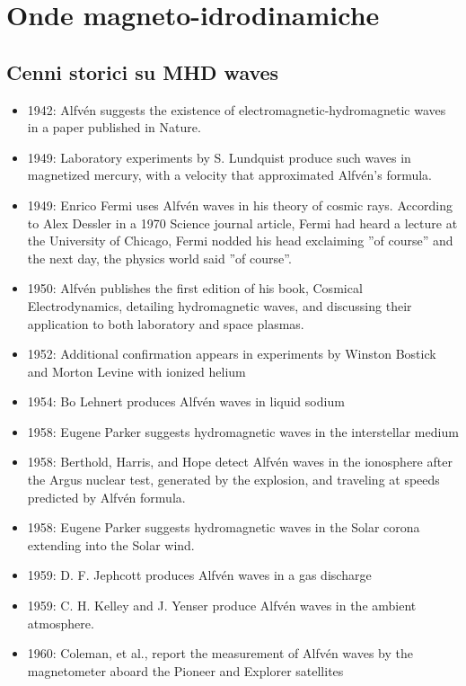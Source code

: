 \documentclass[../main.tex]{subfiles}
\begin{document}
\chapter{Onde magneto-idrodinamiche}
\PartialToc

\section{Cenni storici su MHD waves}
\cite{alfvenweves}

\begin{itemize}
\item 1942: Alfv\'en suggests the existence of electromagnetic-hydromagnetic waves in a paper published in Nature.
\item 1949: Laboratory experiments by S. Lundquist produce such waves in magnetized mercury, with a velocity that approximated Alfvén's formula.
\item 1949: Enrico Fermi uses Alfv\'en waves in his theory of cosmic rays. According to Alex Dessler in a 1970 Science journal article, Fermi had heard a lecture at the University of Chicago, Fermi nodded his head exclaiming ''of course'' and the next day, the physics world said ''of course''.
\item 1950: Alfv\'en publishes the first edition of his book, Cosmical Electrodynamics, detailing hydromagnetic waves, and discussing their application to both laboratory and space plasmas.
\item 1952: Additional confirmation appears in experiments by Winston Bostick and Morton Levine with ionized helium
\item 1954: Bo Lehnert produces Alfv\'en waves in liquid sodium
\item 1958: Eugene Parker suggests hydromagnetic waves in the interstellar medium
\item 1958: Berthold, Harris, and Hope detect Alfv\'en waves in the ionosphere after the Argus nuclear test, generated by the explosion, and traveling at speeds predicted by Alfv\'en formula.
\item 1958: Eugene Parker suggests hydromagnetic waves in the Solar corona extending into the Solar wind.
\item 1959: D. F. Jephcott produces Alfv\'en waves in a gas discharge
\item 1959: C. H. Kelley and J. Yenser produce Alfv\'en waves in the ambient atmosphere.
\item 1960: Coleman, et al., report the measurement of Alfv\'en waves by the magnetometer aboard the Pioneer and Explorer satellites

\end{itemize}
\end{document}
